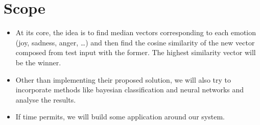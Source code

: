 \section{Scope}
\begin{itemize}
\item At its core, the idea is to find median vectors corresponding to each emotion (joy, sadness, anger, \ldots) and then find the cosine similarity of the new vector composed from test input with the former. The highest similarity vector will be the winner.
\item Other than implementing their proposed solution, we will also try to incorporate methods like bayesian classification and neural networks and analyse the results.
\item If time permits, we will build some application around our system.
\end{itemize}